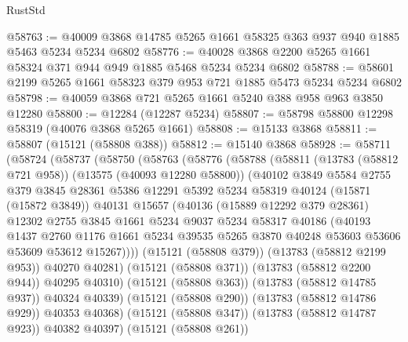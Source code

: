 \begin{lexlean}{RustStd}
\begin{coremodule}
@58763 := @40009 @3868 @14785 @5265 @1661 @58325 @363 @937 @940 @1885 @5463 @5234 @5234 @6802
@58776 := @40028 @3868 @2200 @5265 @1661 @58324 @371 @944 @949 @1885 @5468 @5234 @5234 @6802
@58788 := @58601 @2199 @5265 @1661 @58323 @379 @953 @721 @1885 @5473 @5234 @5234 @6802
@58798 := @40059 @3868 @721 @5265 @1661 @5240 @388 @958 @963 @3850 @12280
@58800 := @12284 (@12287 @5234)
@58807 := @58798 @58800 @12298 @58319 (@40076 @3868 @5265 @1661)
@58808 := @15133 @3868
@58811 := @58807 (@15121 (@58808 @388))
@58812 := @15140 @3868
@58928 := @58711
    (@58724
      (@58737
        (@58750
          (@58763
            (@58776
              (@58788
                (@58811
                  (@13783 (@58812 @721 @958))
                  (@13575 (@40093 @12280 @58800))
                  (@40102
                    @3849
                    @5584
                    @2755
                    @379
                    @3845
                    @28361
                    @5386
                    @12291
                    @5392
                    @5234
                    @58319
                    @40124
                    (@15871 (@15872 @3849))
                    @40131
                    @15657
                    (@40136
                      (@15889 @12292 @379 @28361)
                      @12302
                      @2755
                      @3845
                      @1661
                      @5234
                      @9037
                      @5234
                      @58317
                      @40186
                      (@40193
                        @1437
                        @2760
                        @1176
                        @1661
                        @5234
                        @39535
                        @5265
                        @3870
                        @40248
                        @53603
                        @53606
                        @53609
                        @53612
                        @15267))))
                (@15121 (@58808 @379))
                (@13783 (@58812 @2199 @953))
                @40270
                @40281)
              (@15121 (@58808 @371))
              (@13783 (@58812 @2200 @944))
              @40295
              @40310)
            (@15121 (@58808 @363))
            (@13783 (@58812 @14785 @937))
            @40324
            @40339)
          (@15121 (@58808 @290))
          (@13783 (@58812 @14786 @929))
          @40353
          @40368)
        (@15121 (@58808 @347))
        (@13783 (@58812 @14787 @923))
        @40382
        @40397)
      (@15121 (@58808 @261))

\end{coremodule}
\end{lexlean}
